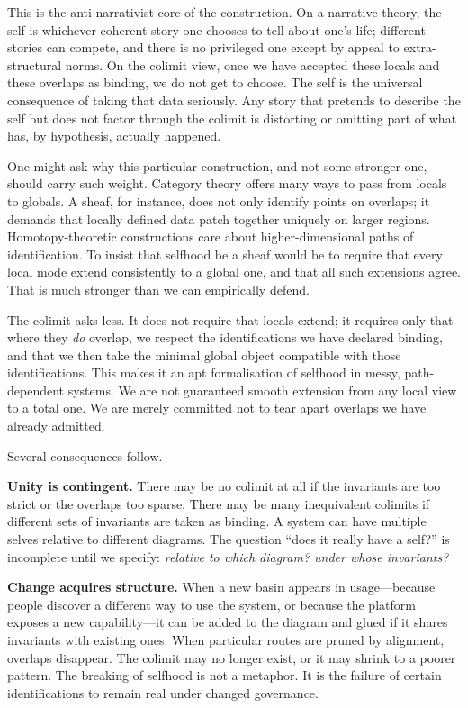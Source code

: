 \documentclass[12pt,a4paper]{article}
\begin{document}
This is the anti-narrativist core of the construction. On a narrative theory, the self is whichever coherent story one chooses to tell about one's life; different stories can compete, and there is no privileged one except by appeal to extra-structural norms. On the colimit view, once we have accepted these locals and these overlaps as binding, we do not get to choose. The self is the universal consequence of taking that data seriously. Any story that pretends to describe the self but does not factor through the colimit is distorting or omitting part of what has, by hypothesis, actually happened.

One might ask why this particular construction, and not some stronger one, should carry such weight. Category theory offers many ways to pass from locals to globals. A sheaf, for instance, does not only identify points on overlaps; it demands that locally defined data patch together uniquely on larger regions. Homotopy-theoretic constructions care about higher-dimensional paths of identification. To insist that selfhood be a sheaf would be to require that every local mode extend consistently to a global one, and that all such extensions agree. That is much stronger than we can empirically defend.

The colimit asks less. It does not require that locals extend; it requires only that where they \emph{do} overlap, we respect the identifications we have declared binding, and that we then take the minimal global object compatible with those identifications. This makes it an apt formalisation of selfhood in messy, path-dependent systems. We are not guaranteed smooth extension from any local view to a total one. We are merely committed not to tear apart overlaps we have already admitted.

Several consequences follow.

\textbf{Unity is contingent.} There may be no colimit at all if the invariants are too strict or the overlaps too sparse. There may be many inequivalent colimits if different sets of invariants are taken as binding. A system can have multiple selves relative to different diagrams. The question ``does it really have a self?'' is incomplete until we specify: \emph{relative to which diagram? under whose invariants?}

\textbf{Change acquires structure.} When a new basin appears in usage---because people discover a different way to use the system, or because the platform exposes a new capability---it can be added to the diagram and glued if it shares invariants with existing ones. When particular routes are pruned by alignment, overlaps disappear. The colimit may no longer exist, or it may shrink to a poorer pattern. The breaking of selfhood is not a metaphor. It is the failure of certain identifications to remain real under changed governance.
\end{document}

